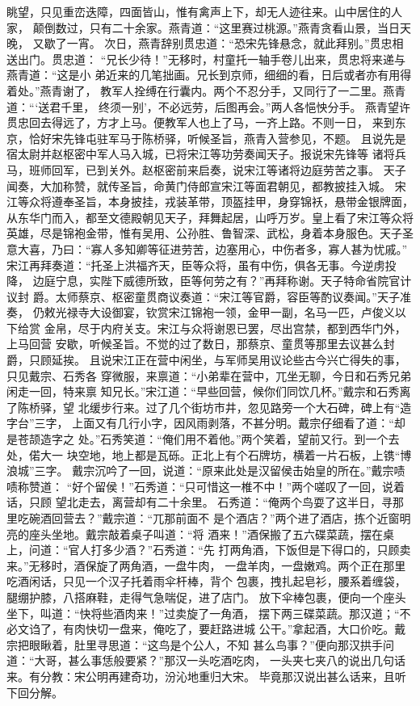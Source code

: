 眺望，只见重峦迭障，四面皆山，惟有禽声上下，却无人迹往来。山中居住的人家，
颠倒数过，只有二十余家。燕青道：“这里赛过桃源。”燕青贪看山景，当日天晚，
又歇了一宵。
次日，燕青辞别贯忠道：“恐宋先锋悬念，就此拜别。”贯忠相送出门。贯忠道：
“兄长少待！”无移时，村童托一轴手卷儿出来，贯忠将来递与燕青道：“这是小
弟近来的几笔拙画。兄长到京师，细细的看，日后或者亦有用得着处。”燕青谢了，
教军人拴缚在行囊内。两个不忍分手，又同行了一二里。燕青道：“‘送君千里，
终须一别’，不必远劳，后图再会。”两人各悒怏分手。
燕青望许贯忠回去得远了，方才上马。便教军人也上了马，一齐上路。不则一日，
来到东京，恰好宋先锋屯驻军马于陈桥驿，听候圣旨，燕青入营参见，不题。
且说先是宿太尉并赵枢密中军人马入城，已将宋江等功劳奏闻天子。报说宋先锋等
诸将兵马，班师回军，已到关外。赵枢密前来启奏，说宋江等诸将边庭劳苦之事。
天子闻奏，大加称赞，就传圣旨，命黄门侍郎宣宋江等面君朝见，都教披挂入城。
宋江等众将遵奉圣旨，本身披挂，戎装革带，顶盔挂甲，身穿锦袄，悬带金银牌面，
从东华门而入，都至文德殿朝见天子，拜舞起居，山呼万岁。皇上看了宋江等众将
英雄，尽是锦袍金带，惟有吴用、公孙胜、鲁智深、武松，身着本身服色。天子圣
意大喜，乃曰：“寡人多知卿等征进劳苦，边塞用心，中伤者多，寡人甚为忧戚。”
宋江再拜奏道：“托圣上洪福齐天，臣等众将，虽有中伤，俱各无事。今逆虏投降，
边庭宁息，实陛下威德所致，臣等何劳之有？”再拜称谢。天子特命省院官计议封
爵。太师蔡京、枢密童贯商议奏道：“宋江等官爵，容臣等酌议奏闻。”天子准奏，
仍敕光禄寺大设御宴，钦赏宋江锦袍一领，金甲一副，名马一匹，卢俊义以下给赏
金帛，尽于内府关支。宋江与众将谢恩已罢，尽出宫禁，都到西华门外，上马回营
安歇，听候圣旨。不觉的过了数日，那蔡京、童贯等那里去议甚么封爵，只顾延挨。
且说宋江正在营中闲坐，与军师吴用议论些古今兴亡得失的事，只见戴宗、石秀各
穿微服，来禀道：“小弟辈在营中，兀坐无聊，今日和石秀兄弟闲走一回，特来禀
知兄长。”宋江道：“早些回营，候你们同饮几杯。”戴宗和石秀离了陈桥驿，望
北缓步行来。过了几个街坊市井，忽见路旁一个大石碑，碑上有“造字台”三字，
上面又有几行小字，因风雨剥落，不甚分明。戴宗仔细看了道：“却是苍颉造字之
处。”石秀笑道：“俺们用不着他。”两个笑着，望前又行。到一个去处，偌大一
块空地，地上都是瓦砾。正北上有个石牌坊，横着一片石板，上镌“博浪城”三字。
戴宗沉吟了一回，说道：“原来此处是汉留侯击始皇的所在。”戴宗啧啧称赞道：
“好个留侯！”石秀道：“只可惜这一椎不中！”两个嗟叹了一回，说着话，只顾
望北走去，离营却有二十余里。
石秀道：“俺两个鸟耍了这半日，寻那里吃碗酒回营去？”戴宗道：“兀那前面不
是个酒店？”两个进了酒店，拣个近窗明亮的座头坐地。戴宗敲着桌子叫道：“将
酒来！”酒保搬了五六碟菜蔬，摆在桌上，问道：“官人打多少酒？”石秀道：“先
打两角酒，下饭但是下得口的，只顾卖来。”无移时，酒保旋了两角酒，一盘牛肉，
一盘羊肉，一盘嫩鸡。两个正在那里吃酒闲话，只见一个汉子托着雨伞杆棒，背个
包裹，拽扎起皂衫，腰系着缠袋，腿绷护膝，八搭麻鞋，走得气急喘促，进了店门。
放下伞棒包裹，便向一个座头坐下，叫道：“快将些酒肉来！”过卖旋了一角酒，
摆下两三碟菜蔬。那汉道；“不必文诌了，有肉快切一盘来，俺吃了，要赶路进城
公干。”拿起酒，大口价吃。戴宗把眼瞅着，肚里寻思道：“这鸟是个公人，不知
甚么鸟事？”便向那汉拱手问道：“大哥，甚么事恁般要紧？”那汉一头吃酒吃肉，
一头夹七夹八的说出几句话来。有分教：宋公明再建奇功，汾沁地重归大宋。
毕竟那汉说出甚么话来，且听下回分解。